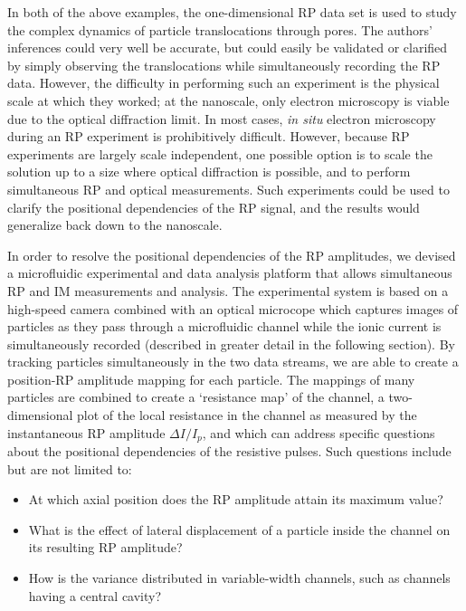 		In both of the above examples, the one-dimensional RP data set is used to study the complex dynamics of particle translocations through pores. The authors' inferences could very well be accurate, but could easily be validated or clarified by simply observing the translocations while simultaneously recording the RP data. However, the difficulty in performing such an experiment is the physical scale at which they worked; at the nanoscale, only electron microscopy is viable due to the optical diffraction limit. In most cases, \textit{in situ} electron microscopy during an RP experiment is prohibitively difficult. However, because RP experiments are largely scale independent, one possible option is to scale the solution up to a size where optical diffraction is possible, and to perform simultaneous RP and optical measurements. Such experiments could be used to clarify the positional dependencies of the RP signal, and the results would generalize back down to the nanoscale.
		
		In order to resolve the positional dependencies of the RP amplitudes, we devised a microfluidic experimental and data analysis platform that allows simultaneous RP and IM measurements and analysis. The experimental system is based on a high-speed camera combined with an optical microcope which captures images of particles as they pass through a microfluidic channel while the ionic current is simultaneously recorded (described in greater detail in the following section). By tracking particles simultaneously in the two data streams, we are able to create a position-RP amplitude mapping for each particle. The mappings of many particles are combined to create a `resistance map' of the channel, a two-dimensional plot of the local resistance in the channel as measured by the instantaneous RP amplitude $\Delta I/I_{p}$, and which can address specific questions about the positional dependencies of the resistive pulses. Such questions include but are not limited to:
		
		\begin{itemize}
			\item At which axial position does the RP amplitude attain its maximum value?
			\item What is the effect of lateral displacement of a particle inside the channel on its resulting RP amplitude?
			\item How is the variance distributed in variable-width channels, such as channels having a central cavity?
		\end{itemize}

